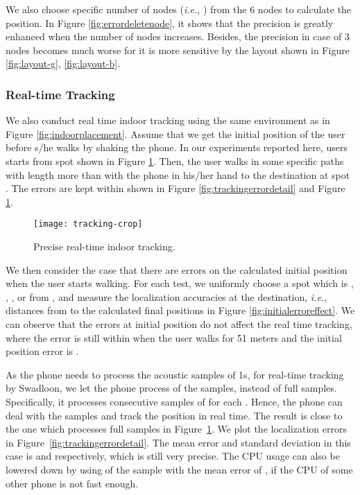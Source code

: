 \documentclass[]{sig-alternate-10pt}
\def\ie{\textit{i.e.}\xspace}
\def \ourprotocol{Swadloon\xspace}
\begin{document}
 We also choose specific number of nodes (\ie, ) from the
 6 nodes to calculate the position. In Figure
 \ref{fig:errordeletenode}, it shows that the precision is greatly
 enhanced when the number of nodes increases. Besides, the precision in
 case of 3 nodes becomes much worse for it is more sensitive by
 the layout shown in Figure  \ref{fig:layout-g},  \ref{fig:layout-b}.




\subsubsection{Real-time Tracking}

We also conduct  real time indoor tracking using the same environment
as in Figure \ref{fig:indoorplacement}.
Assume that we  get the initial position of the user before s/he walks
by  shaking the phone.
In our experiments reported here, users starts from spot
 shown in Figure \ref{fig:realtime}. Then, the user
walks in some specific paths with length more than  with the
phone in his/her hand to the destination at spot . The errors are kept within  shown in Figure \ref{fig:trackingerrordetail} and Figure \ref{fig:realtime}.

\begin{figure}[ht]
    \begin{center}
        \texttt{[image: tracking-crop]}
    \end{center}
    \caption{Precise real-time indoor tracking.}
    \label{fig:realtime}
\end{figure}


We then consider the case that there are errors on the calculated initial
 position when the user starts walking.
For each test, we uniformly choose a spot which is ,
 , , or  from , and
 measure the localization accuracies at the destination,
 \ie, distances from  to the calculated
 final positions in Figure \ref{fig:initialerroreffect}. We can observe that the errors at initial position do not affect the real
 time tracking, where the error is still within  when the user
 walks for 51 meters and the initial position error is .



As the phone needs  to process the acoustic samples of 1s, for
 real-time tracking by \ourprotocol,
 we let the phone process  of the samples, instead
 of  full samples.
Specifically, it processes consecutive samples of
  for each .
Hence, the phone can deal with the samples and
 track the position in real time.
The result is  close to the one which processes full  samples in Figure~\ref{fig:realtime}.
We  plot the localization errors in
Figure~\ref{fig:trackingerrordetail}.
The mean error and standard deviation in  this case is  and 
respectively, which is still very precise. The CPU usage can also be
lowered down by using  of the sample with the mean error of
, if the CPU of some other phone is not fast enough.
\end{document}
